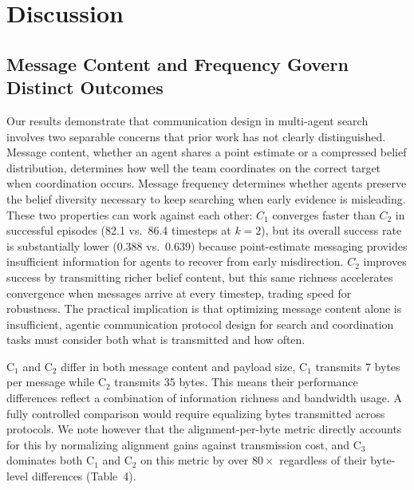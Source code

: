 \documentclass[pdflatex,sn-mathphys-num]{sn-jnl}%
\theoremstyle{thmstyleone}%
\theoremstyle{thmstyletwo}%
\theoremstyle{thmstylethree}%
\begin{document}
\section{Discussion}

\subsection{Message Content and Frequency Govern Distinct Outcomes}
Our results demonstrate that communication design in multi-agent search involves two separable concerns that prior work has not clearly distinguished. Message content, whether an agent shares a point estimate or a compressed belief distribution, determines how well the team coordinates on the correct target when coordination occurs. Message frequency determines whether agents preserve the belief diversity necessary to keep searching when early evidence is misleading. These two properties can work against each other: $C_1$ converges faster than $C_2$ in successful episodes (82.1 vs.\ 86.4 timesteps at $k{=}2$), but its overall success rate is 
substantially lower (0.388 vs.\ 0.639) because point-estimate messaging provides insufficient information for agents to recover from early misdirection. $C_2$ improves success by transmitting richer belief content, but this same richness accelerates convergence when messages arrive at every timestep, trading speed for robustness. The practical implication is that optimizing message content alone is insufficient, agentic communication protocol design for search and coordination tasks must consider both what is transmitted and how often.

C$_1$ and C$_2$ differ in both message content and payload size,
C$_1$ transmits 7 bytes per message while C$_2$ transmits 35 bytes. 
This means their performance differences reflect a combination of 
information richness and bandwidth usage. A fully controlled comparison 
would require equalizing bytes transmitted across protocols. We note 
however that the alignment-per-byte metric directly accounts for this 
by normalizing alignment gains against transmission cost, and 
C$_3$ dominates both C$_1$ and C$_2$ on this metric by over 
$80\times$ regardless of their byte-level differences (Table~4).
\end{document}
